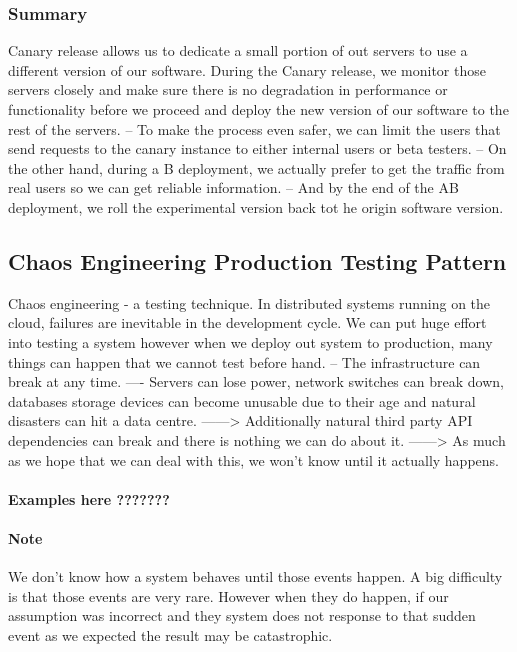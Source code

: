 \documentclass[a4paper, 11pt]{book}
\begin{document}
    \subsubsection{Summary}
    Canary release allows us to dedicate a small portion of out servers to use a different version of our software.
    During the Canary release, we monitor those servers closely and make sure there is no degradation in performance or functionality before we proceed and deploy the new version of our software to the rest of the servers.
    -- To make the process even safer, we can limit the users that send requests to the canary instance to either internal users or beta testers.
    -- On the other hand, during a B deployment, we actually prefer to get the traffic from real users so we can get reliable information.
    -- And by the end of the AB deployment, we roll the experimental version back tot he origin software version.

    \subsection{Chaos Engineering Production Testing Pattern}
    Chaos engineering - a testing technique.
    In distributed systems running on the cloud, failures are inevitable in the development cycle.
    We can put huge effort into testing a system however when we deploy out system to production, many things can happen that we cannot test before hand.
    -- The infrastructure can break at any time.
    ---- Servers can lose power, network switches can break down, databases storage devices can become unusable due to their age and natural disasters can hit a data centre.
    ------> Additionally natural third party API dependencies can break and there is nothing we can do about it.
    ------> As much as we hope that we can deal with this, we won't know until it actually happens.

    \paragraph{Examples here ???????}

    \paragraph{Note}
    We don't know how a system behaves until those events happen.
    A big difficulty is that those events are very rare.
    However when they do happen, if our assumption was incorrect and they system does not response to that sudden event as we expected the result may be catastrophic.
\end{document}
